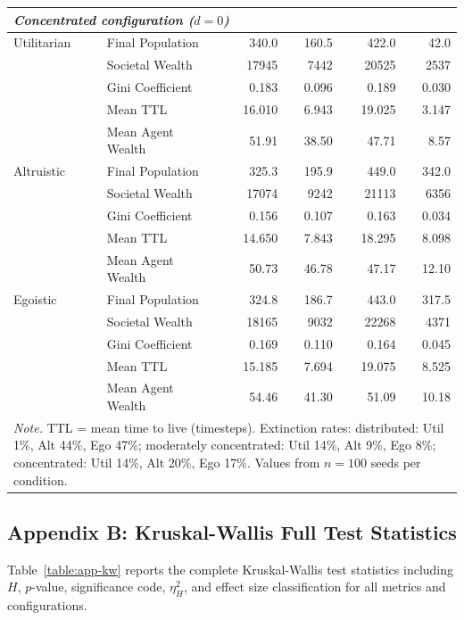 \documentclass{icsthesis}
\begin{document}
\begin{mainmatter}
\begin{longtable}{l l r r r r}
		\hline
		\multicolumn{6}{l}{\textit{Concentrated configuration ($d = 0$)}} \\
		\hline
		Utilitarian & Final Population      & 340.0  & 160.5  & 422.0  & 42.0   \\
		            & Societal Wealth       & 17945  & 7442   & 20525  & 2537   \\
		            & Gini Coefficient      & 0.183  & 0.096  & 0.189  & 0.030  \\
		            & Mean TTL              & 16.010 & 6.943  & 19.025 & 3.147  \\
		            & Mean Agent Wealth     & 51.91  & 38.50  & 47.71  & 8.57   \\
		Altruistic  & Final Population      & 325.3  & 195.9  & 449.0  & 342.0  \\
		            & Societal Wealth       & 17074  & 9242   & 21113  & 6356   \\
		            & Gini Coefficient      & 0.156  & 0.107  & 0.163  & 0.034  \\
		            & Mean TTL              & 14.650 & 7.843  & 18.295 & 8.098  \\
		            & Mean Agent Wealth     & 50.73  & 46.78  & 47.17  & 12.10  \\
		Egoistic    & Final Population      & 324.8  & 186.7  & 443.0  & 317.5  \\
		            & Societal Wealth       & 18165  & 9032   & 22268  & 4371   \\
		            & Gini Coefficient      & 0.169  & 0.110  & 0.164  & 0.045  \\
		            & Mean TTL              & 15.185 & 7.694  & 19.075 & 8.525  \\
		            & Mean Agent Wealth     & 54.46  & 41.30  & 51.09  & 10.18  \\
		\multicolumn{6}{p{\linewidth}}{\footnotesize\textit{Note.} TTL = mean time to live (timesteps). Extinction rates: distributed: Util 1\%, Alt 44\%, Ego 47\%; moderately concentrated: Util 14\%, Alt 9\%, Ego 8\%; concentrated: Util 14\%, Alt 20\%, Ego 17\%. Values from $n = 100$ seeds per condition.}
		\end{longtable}

		\subsection*{Appendix B: Kruskal-Wallis Full Test Statistics}

		Table~\ref{table:app-kw} reports the complete Kruskal-Wallis test statistics including $H$, $p$-value, significance code, $\eta^2_H$, and effect size classification for all metrics and configurations.


\end{mainmatter}
\end{document}
